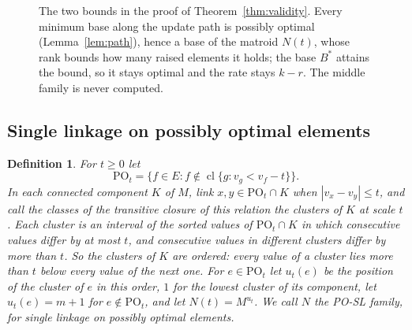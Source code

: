 \documentclass[11pt]{article}
\newtheorem{definition}[theorem]{Definition}
\newcommand{\cl}{\operatorname{cl}}
\newcommand{\PO}{\mathrm{PO}}
\newcommand{\Bases}{\mathcal B}
\newcommand{\Pos}{\mathcal P}
\begin{document}
\begin{figure}[t]
  \centering
  \caption{The two bounds in the proof of Theorem~\ref{thm:validity}.  Every
  minimum base along the update path is possibly optimal (Lemma~\ref{lem:path}),
  hence a base of the matroid $N(t)$, whose rank bounds how many raised elements
  it holds; the base $B^{*}$ attains the bound, so it stays optimal and the
  rate stays $k-r$.  The middle family is never computed.}
  \label{fig:sandwich}
\end{figure}

\subsection{Single linkage on possibly optimal elements}
\label{sec:posl}

\begin{definition}
\label{def:posl}
For $t\ge0$ let
\[
  \PO_t=\bigl\{f\in E:f\notin\cl\{g:v_g<v_f-t\}\bigr\}.
\]
In each connected component $K$ of $M$, link $x,y\in\PO_t\cap K$ when
$|v_x-v_y|\le t$, and call the classes of the transitive closure of this relation
the \emph{clusters} of $K$ at scale $t$.  Each cluster is an interval of the
sorted values of $\PO_t\cap K$ in which consecutive values differ by at most $t$,
and consecutive values in different clusters differ by more than $t$.  So the
clusters of $K$ are ordered: every value of a cluster lies more than $t$ below
every value of the next one.  For $e\in\PO_t$ let $u_t(e)$ be the position of the
cluster of $e$ in this order, $1$ for the lowest cluster of its component, let
$u_t(e)=m+1$ for $e\notin\PO_t$, and let $N(t)=M^{u_t}$.  We call $N$ the \emph{PO-SL} family, for single linkage
on possibly optimal elements.
\end{definition}
\end{document}
